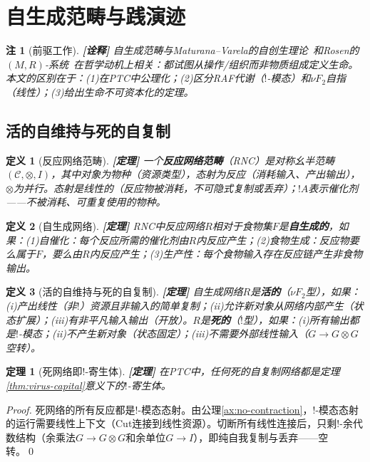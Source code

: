 \documentclass[11pt,a4paper]{article}
\newtheorem{definition}{定义}
\newtheorem{theorem}{定理}
\newtheorem{remark}{注}
\newcommand{\lvl}[1]{\hfill\textbf{\footnotesize[#1]}}
\newcommand{\lvP}{\lvl{定理}}
\newcommand{\lvI}{\lvl{诠释}}
\newcommand{\bang}{{!}}
\newcommand{\tensor}{\otimes}
\begin{document}
\section{自生成范畴与践演迹}

\begin{remark}[前驱工作]\lvI
自生成范畴与Maturana--Varela的自创生理论~\cite{maturana80}和Rosen的$(M,R)$-系统~\cite{rosen91}在哲学动机上相关：都试图从操作/组织而非物质组成定义生命。本文的区别在于：(1)在PTC中公理化；(2)区分RAF代谢（$\bang$-模态）和$\nu F_2$自指（线性）；(3)给出生命不可资本化的定理。
\end{remark}

\subsection{活的自维持与死的自复制}

\begin{definition}[反应网络范畴]\label{def:rnc}\lvP
一个\textbf{反应网络范畴}（RNC）是对称幺半范畴$(\mathcal{C},\tensor,I)$，其中对象为物种（资源类型），态射为反应（消耗输入、产出输出），$\tensor$为并行。态射是线性的（反应物被消耗，不可隐式复制或丢弃）；$\bang A$表示催化剂——不被消耗、可重复使用的物种。
\end{definition}

\begin{definition}[自生成网络]\label{def:self-generating}\lvP
RNC中反应网络$R$相对于食物集$F$是\textbf{自生成的}，如果：(1)自催化：每个反应所需的催化剂由$R$内反应产生；(2)食物生成：反应物要么属于$F$，要么由$R$内反应产生；(3)生产性：每个食物输入存在反应链产生非食物输出。
\end{definition}

\begin{definition}[活的自维持与死的自复制]\label{def:living-dead}\lvP
自生成网络$R$是\textbf{活的}（$\nu F_2$型），如果：(i)产出线性（非$\bang$）资源且非输入的简单复制；(ii)允许新对象从网络内部产生（状态扩展）；(iii)有非平凡输入输出（开放）。$R$是\textbf{死的}（$\bang$型），如果：(i)所有输出都是$\bang$-模态；(ii)不产生新对象（状态固定）；(iii)不需要外部线性输入（$G\to G\tensor G$空转）。
\end{definition}

\begin{theorem}[死网络即$\bang$-寄生体]\label{thm:dead-is-parasite}\lvP
在PTC中，任何死的自复制网络都是定理\ref{thm:virus-capital}意义下的$\bang$-寄生体。
\end{theorem}

\begin{proof}
死网络的所有反应都是$\bang$-模态态射。由公理\ref{ax:no-contraction}，$\bang$-模态态射的运行需要线性上下文（Cut连接到线性资源）。切断所有线性连接后，只剩$\bang$-余代数结构（余乘法$G\to G\tensor G$和余单位$G\to I$），即纯自我复制与丢弃——空转。\qed
\end{proof}
\end{document}
